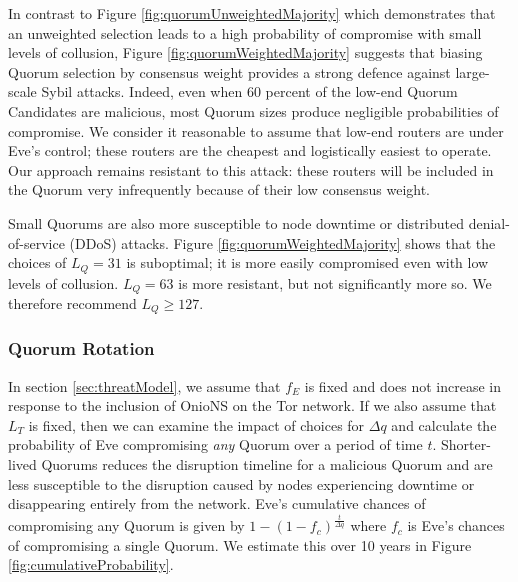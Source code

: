 \documentclass[conference]{IEEEtran}
\begin{document}
\newpage

In contrast to Figure \ref{fig:quorumUnweightedMajority} which demonstrates that an unweighted selection leads to a high probability of compromise with small levels of collusion, Figure \ref{fig:quorumWeightedMajority} suggests that biasing Quorum selection by consensus weight provides a strong defence against large-scale Sybil attacks. Indeed, even when 60 percent of the low-end Quorum Candidates are malicious, most Quorum sizes produce negligible probabilities of compromise. We consider it reasonable to assume that low-end routers are under Eve's control; these routers are the cheapest and logistically easiest to operate. Our approach remains resistant to this attack: these routers will be included in the Quorum very infrequently because of their low consensus weight.

Small Quorums are also more susceptible to node downtime or distributed denial-of-service (DDoS) attacks. Figure \ref{fig:quorumWeightedMajority} shows that the choices of $ L_{Q} = 31 $ is suboptimal; it is more easily compromised even with low levels of collusion. $ L_{Q} = 63 $ is more resistant, but not significantly more so. We therefore recommend $ L_{Q} \geq 127 $.

\subsubsection{Quorum Rotation}

In section \ref{sec:threatModel}, we assume that $ f_{E} $ is fixed and does not increase in response to the inclusion of OnioNS on the Tor network. If we also assume that $ L_{T} $ is fixed, then we can examine the impact of choices for $ \Delta q $ and calculate the probability of Eve compromising \emph{any} Quorum over a period of time $ t $. Shorter-lived Quorums reduces the disruption timeline for a malicious Quorum and are less susceptible to the disruption caused by nodes experiencing downtime or disappearing entirely from the network. Eve's cumulative chances of compromising any Quorum is given by $ 1 - (1 - f_{c})^{\frac{t}{\Delta q}} $ where $ f_{c} $ is Eve's chances of compromising a single Quorum. We estimate this over 10 years in Figure \ref{fig:cumulativeProbability}.
\end{document}
